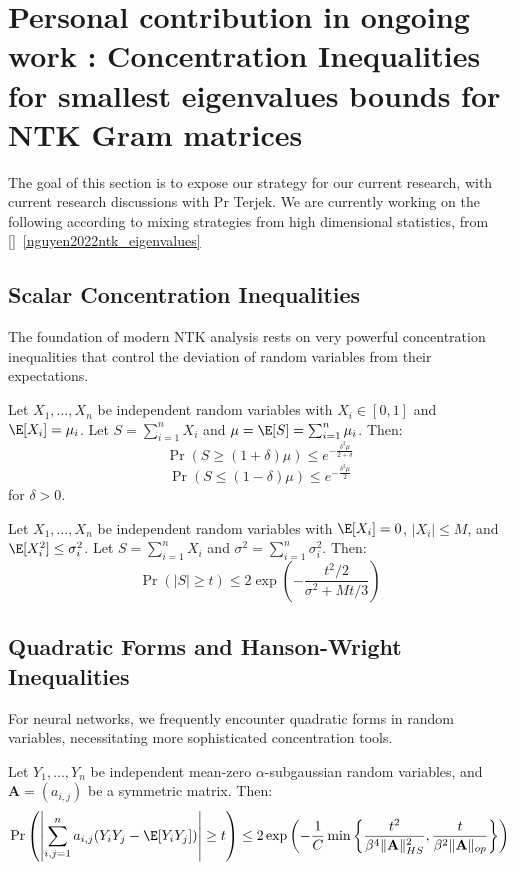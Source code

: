\newpage

\section{Personal contribution in ongoing work : Concentration Inequalities for smallest eigenvalues bounds for NTK Gram matrices}

The goal of this section is to expose our strategy for our current research, with current research discussions with Pr Terjek.
We are currently working on the following according to mixing strategies from high dimensional statistics, 
from []~\ref{nguyen2022ntk_eigenvalues}


\subsection{Scalar Concentration Inequalities}

The foundation of modern NTK analysis rests on very powerful concentration inequalities that control the deviation of random variables from their expectations.

\begin{theorem}
Let $X_1, \ldots, X_n$ be independent random variables with $X_i \in [0,1]$ and $\E[X_i] = \mu_i$. Let $S = \sum_{i=1}^n X_i$ and $\mu = \E[S] = \sum_{i=1}^n \mu_i$. Then:
$$\Pr(S \geq (1+\delta)\mu) \leq e^{-\frac{\delta^2 \mu}{2+\delta}}$$
$$\Pr(S \leq (1-\delta)\mu) \leq e^{-\frac{\delta^2 \mu}{2}}$$
for $\delta > 0$.
\end{theorem}

\begin{theorem}
Let $X_1, \ldots, X_n$ be independent random variables with $\E[X_i] = 0$, $|X_i| \leq M$, and $\E[X_i^2] \leq \sigma_i^2$. Let $S = \sum_{i=1}^n X_i$ and $\sigma^2 = \sum_{i=1}^n \sigma_i^2$. Then:
$$\Pr(|S| \geq t) \leq 2\exp\left(-\frac{t^2/2}{\sigma^2 + Mt/3}\right)$$
\end{theorem}

\subsection{Quadratic Forms and Hanson-Wright Inequalities}

For neural networks, we frequently encounter quadratic forms in random variables, necessitating more sophisticated concentration tools.

\begin{theorem}
Let $Y_1, \ldots, Y_n$ be independent mean-zero $\alpha$-subgaussian random variables, and $\mathbf{A} = (a_{i,j})$ be a symmetric matrix. Then:
$$\Pr\left(\left|\sum_{i,j=1}^n a_{i,j}(Y_i Y_j - \E[Y_i Y_j])\right| \geq t\right) \leq 2\exp\left(-\frac{1}{C}\min\left\{\frac{t^2}{\beta^4\|\mathbf{A}\|_{HS}^2}, \frac{t}{\beta^2\|\mathbf{A}\|_{op}}\right\}\right)$$
\end{theorem}

